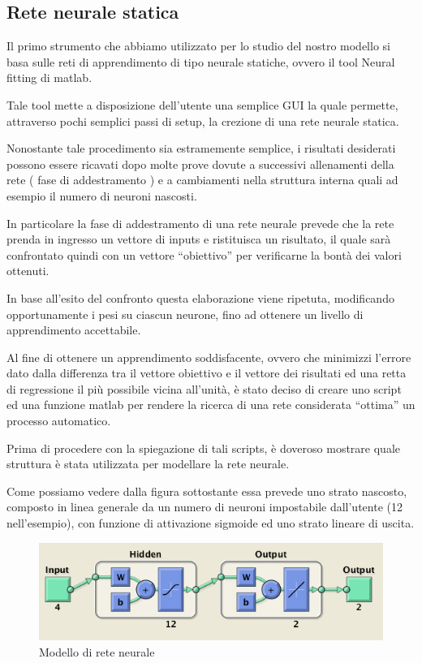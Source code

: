 \subsection{Rete neurale statica}
Il primo strumento che abbiamo utilizzato per lo studio del nostro modello si basa sulle reti di apprendimento di tipo neurale statiche, ovvero il tool Neural fitting di matlab.

Tale tool mette a disposizione dell'utente una semplice GUI la quale permette, attraverso pochi semplici passi di setup, la crezione di una rete neurale statica.

Nonostante tale procedimento sia estramemente semplice, i risultati desiderati possono essere ricavati dopo molte prove dovute a successivi allenamenti della rete ( fase di addestramento ) e a cambiamenti nella struttura interna quali ad esempio il numero di neuroni nascosti.

In particolare la fase di addestramento di una rete neurale prevede che la rete prenda in ingresso un vettore di inputs e ristituisca un risultato, il quale sarà confrontato quindi con un vettore “obiettivo” per verificarne la bontà dei valori ottenuti.

In base all’esito del confronto questa elaborazione viene ripetuta, modificando opportunamente i pesi su ciascun neurone, fino ad ottenere un livello di apprendimento accettabile.

Al fine di ottenere un apprendimento soddisfacente, ovvero che minimizzi l’errore dato dalla differenza tra il vettore obiettivo e il vettore dei risultati ed una retta di regressione il più possibile vicina all'unità, è stato deciso di creare uno script ed una funzione matlab per rendere la ricerca di una rete considerata “ottima” un processo automatico.

Prima di procedere con la spiegazione di tali scripts, è doveroso mostrare quale struttura è stata utilizzata per modellare la rete neurale.

Come possiamo vedere dalla figura sottostante essa prevede uno strato nascosto, composto in linea generale da un numero di neuroni impostabile dall'utente (12 nell'esempio), con funzione di attivazione sigmoide ed uno strato lineare di uscita.

\begin{figure}
  \centering
  \includegraphics[scale=0.5]{images/neural_net/net.png}
  \caption{Modello di rete neurale}
\end{figure}


